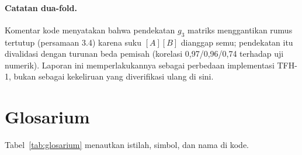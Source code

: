 \paragraph{Catatan dua-fold.} Komentar kode 
menyatakan bahwa pendekatan $g_3$ matriks menggantikan rumus tertutup
\citet{torabi2014small} (persamaan 3.4) karena suku $[A][B]$ dianggap
semu; pendekatan itu divalidasi dengan turunan beda pemisah (korelasi
0,97/0,96/0,74 terhadap uji numerik). Laporan ini memperlakukannya sebagai
perbedaan implementasi TFH-1, bukan sebagai kekeliruan yang diverifikasi
ulang di sini.

\section{Glosarium}\label{app:glosarium}

Tabel~\ref{tab:glosarium} menautkan istilah, simbol, dan nama di kode.

